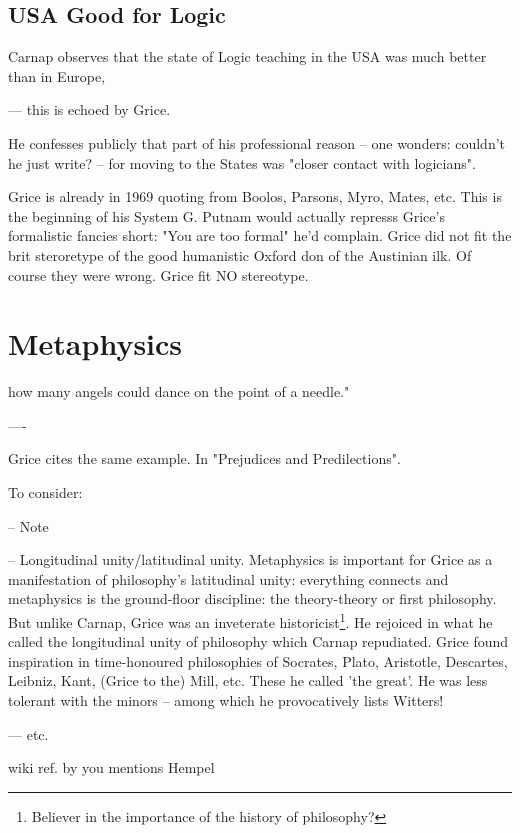 \documentclass[10pt,titlepage]{book}
\begin{document}
{\subsection{USA Good for Logic}

 Carnap observes that the state of Logic teaching in  the USA was much better than in Europe, 
 
--- this is echoed by Grice.
 
He confesses publicly that part of his professional reason -- one wonders:  
couldn't he just write? -- for moving to the States was "closer contact 
with  logicians".
 
Grice is already in 1969 quoting from Boolos, Parsons, Myro, Mates, etc.  
This is the beginning of his System G. Putnam would actually represss Grice's formalistic fancies short: "You are too formal" he'd complain.
Grice did not fit the brit steroretype of the good humanistic Oxford don of the 
Austinian ilk. Of  course they were wrong.
Grice fit NO stereotype.

\section{Metaphysics}

how many angels could dance on the point of a needle." 
 
----
 
Grice cites the same example.
In "Prejudices and Predilections".
 
To consider:
 
-- Note
 
-- Longitudinal unity/latitudinal unity.
Metaphysics is important for Grice as a manifestation of philosophy's latitudinal unity: everything connects and metaphysics is the ground-floor discipline: the theory-theory or first philosophy.
But unlike Carnap, Grice was an inveterate historicist\footnote{Believer in the importance of the history of philosophy?}. 
He rejoiced in what he called the longitudinal unity of philosophy which Carnap repudiated.
Grice found inspiration in time-honoured philosophies of Socrates, Plato, Aristotle, Descartes, Leibniz, Kant, (Grice to the) Mill, etc. 
These he called 'the great'.
He was less tolerant with the minors -- among which he provocatively lists Witters!
 
--- etc. 

wiki ref. by you mentions Hempel
 
}
\end{document}
